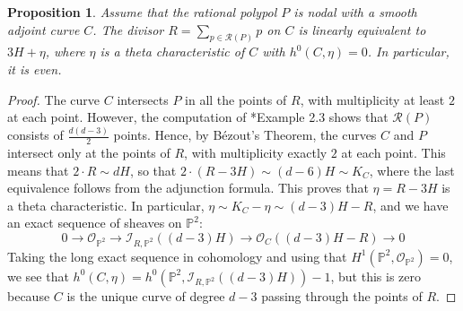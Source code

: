 \documentclass[12pt]{article}
\newtheorem{proposition}[theorem]{Proposition}
\numberwithin{equation}{section}
\theoremstyle{definition}
\begin{document}
\begin{proposition}\label{prop:thetacharpolypol}
	Assume that the rational polypol $P$ is nodal with a smooth adjoint curve $C$. The divisor $R = \sum_{p\in \mathcal{R}(P)} p$ on $C$ is linearly equivalent to $3H+\eta$, where $\eta$ is a theta characteristic of $C$ with $h^0(C,\eta)=0$. In particular, it is even.
\end{proposition}
\begin{proof}
	The curve $C$ intersects $P$ in all the points of $R$, with multiplicity at least $2$ at each point. However, the computation of \cite{polypols}*{Example 2.3} shows that $\mathcal{R}(P)$ consists of $\frac{d(d-3)}{2}$ points. Hence, by B\'ezout's Theorem, the curves $C$ and $P$ intersect only at the points of $R$, with multiplicity exactly $2$ at each point. This means that $2\cdot R \sim dH$, so that $2\cdot (R-3H) \sim (d-6)H \sim K_C$, where the last equivalence follows from the adjunction formula. 
	This proves that $\eta = R-3H$ is a theta characteristic. In particular, $\eta \sim K_C-\eta \sim (d-3)H-R$, and we have an exact sequence of sheaves on $\mathbb{P}^2$:
	\begin{equation}\label{eq:idealsheafR} 
	0 \longrightarrow \mathcal{O}_{\mathbb{P}^2} \longrightarrow \mathcal{I}_{R,\mathbb{P}^2}((d-3)H) \longrightarrow \mathcal{O}_{C}((d-3)H-R) \longrightarrow 0
	\end{equation}
	Taking the long exact sequence in cohomology and using that $H^1(\mathbb{P}^2,\mathcal{O}_{\mathbb{P}^2})=0$, we see that $h^0(C,\eta) = h^0(\mathbb{P}^2,\mathcal{I}_{R,\mathbb{P}^2}((d-3)H))-1$, but this is zero because $C$ is the unique curve of degree $d-3$ passing through the points of $R$.
\end{proof}
\end{document}
